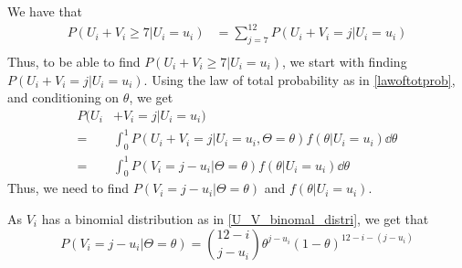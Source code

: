 We have that
\begin{equation}
\label{redmajor1}
    \begin{aligned}
        P(U_i+V_i \geq 7 | U_i=u_i) 
        &= \sum_{j=7}^{12} P(U_i+V_i = j | U_i=u_i)\\[6pt]
    \end{aligned}
\end{equation}
Thus, to be able to find $P(U_i+V_i \geq 7 | U_i=u_i)$, we start with finding $P(U_i+V_i = j | U_i=u_i)$. Using the law of total probability as in \eqref{lawoftotprob}, and conditioning on $\theta$, we get
\begin{equation} 
\label{prob_red_major}
    \begin{aligned}
        P(U_i&+V_i = j | U_i=u_i) \\[6pt]
        =& \int_0^1 P(U_i+V_i = j | U_i=u_i, \Theta=\theta) f(\theta| U_i=u_i) \dd \theta \\[6pt]
        =& \int_0^1 P(V_i = j-u_i | \Theta=\theta) f(\theta| U_i=u_i) \dd \theta
    \end{aligned}
\end{equation}
Thus, we need to find $P(V_i = j-u_i | \Theta=\theta)$ and $f(\theta| U_i=u_i)$. 

As $V_i$ has a binomial distribution as in \eqref{U_V_binomal_distri}, we get that
\begin{equation}
\label{vi_equal_j_minus_ui}
    P(V_i=j-u_i|\Theta=\theta)=\binom{12-i}{j-u_i}\theta^{j-u_i}(1-\theta)^{12-i-(j-u_i)}
\end{equation}



